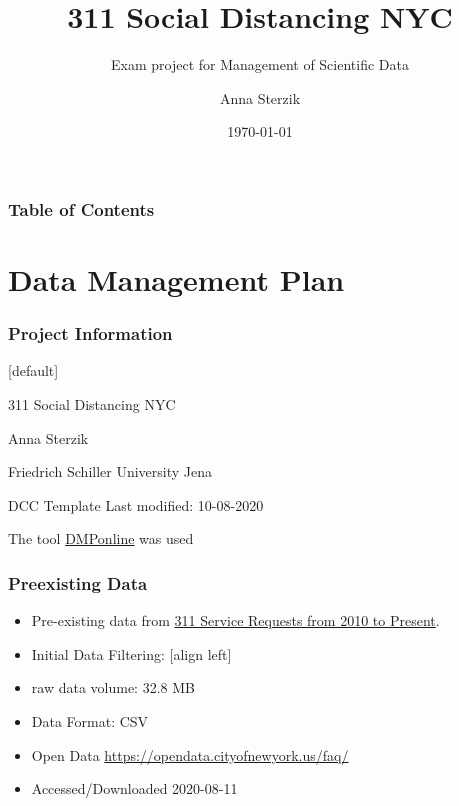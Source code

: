 \documentclass{beamer}
\title{311 Social Distancing NYC}
\subtitle{Exam project for Management of Scientific Data}
\author{Anna Sterzik}
\institute{Friedrich Schiller Universität Jena}
\date{\today}
\begin{document}
\frame{\titlepage}
\begin{frame}
\frametitle{Table of Contents}
\tableofcontents
\end{frame}

\section{Data Management Plan}
\begin{frame}
\frametitle{Project Information}
[default]
\begin{description}[style=multiline]
\item[Project name:] 311 Social Distancing NYC
\vfill
\item[Creator:] Anna Sterzik
\vfill
\item[Affiliation:] Friedrich Schiller University Jena
\vfill
\item[Template:] DCC Template
Last modified: 10-08-2020
\item The tool \href{https://dmponline.dcc.ac.uk/}{DMPonline} was used
\end{description}

\end{frame}
\begin{frame}
\frametitle{Preexisting Data}
\begin{itemize}
\item Pre-existing data from \href{https://data.cityofnewyork.us/Social-Services/311-Service-Requests-from-2010-to-Present/erm2-nwe9}{311 Service Requests from 2010 to Present}.
\vfill
\item Initial Data Filtering:
[align left]
\vfill
\item raw data volume: 32.8 MB
\vfill
\item Data Format: CSV
\vfill
\item Open Data \url{https://opendata.cityofnewyork.us/faq/}
\vfill
\item Accessed/Downloaded 2020-08-11
\end{itemize}
\end{frame}
\end{document}
